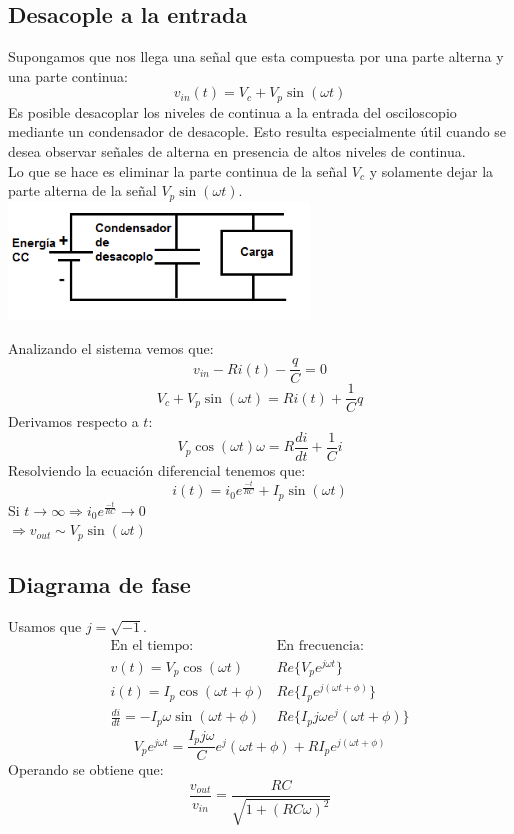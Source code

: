 \documentclass{report}
\begin{document}
\subsection{Desacople a la entrada}
Supongamos que nos llega una señal que esta compuesta por una parte alterna y una parte continua:
\[
	v_{in}(t) = V_c + V_p\sin(\omega t)
\]
Es posible desacoplar los niveles de continua a la entrada del osciloscopio mediante un condensador de desacople. Esto resulta especialmente útil cuando se desea observar señales de alterna en presencia de altos niveles de continua.\\
Lo que se hace es eliminar la parte continua de la señal \(V_c\) y solamente dejar la parte alterna de la señal \(V_p\sin(\omega t)\).\\
\includegraphics[width=8cm]{../Assets/condensador_desacople.png}

Analizando el sistema vemos que:
\[
	v_{in} - Ri(t) - \frac{q}{C} = 0
\]
\[
	V_c + V_p\sin(\omega t) = Ri(t) + \frac{1}{C}q
\]
Derivamos respecto a \(t\):
\[
	V_p\cos(\omega t)\omega = R\frac{di}{dt} + \frac{1}{C}i
\]
Resolviendo la ecuación diferencial tenemos que:
\[
	i(t) = i_0e^{\frac{-t}{RC}} + I_p\sin(\omega t)
\]
Si \(t \to \infty \Rightarrow i_0e^{\frac{-t}{RC}} \to 0\) \\
\(\Rightarrow v_{out} \sim V_p\sin(\omega t)\)

\subsection{Diagrama de fase} %
Usamos que \(j=\sqrt{-1}\).
\[
	\begin{array}{ll}
		\text{En el tiempo:}                            & \text{En frecuencia:}                \\ \hline
		v(t)= V_p\cos(\omega t)                         & Re\{V_pe^{j\omega t}\}               \\
		i(t) = I_p\cos(\omega t + \phi)                 & Re\{I_pe^{j(\omega t + \phi)}\}      \\
		\frac{di}{dt} = -I_p\omega\sin(\omega t + \phi) & Re\{I_pj\omega e^j(\omega t +\phi)\}
	\end{array}
\]
\[
	V_pe^{j\omega t} = \frac{I_pj\omega}{C}e^j(\omega t +\phi) + RI_pe^{j(\omega t + \phi)}
\]
Operando se obtiene que:
\[
	\frac{v_{out}}{v_{in}} = \frac{RC}{\sqrt{1 + (RC\omega)^2}}
\]
\end{document}
